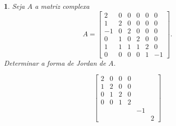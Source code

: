 \documentclass[12pt]{exam}
\newtheorem{exercicio}{}
\begin{document}
\begin{exercicio}
  Seja $A$ a matriz complexa
  \[
      A = \begin{bmatrix}
        2 & 0 & 0 & 0 & 0 & 0\\
        1 & 2 & 0 & 0 & 0 & 0\\
        -1 & 0 & 2 & 0 & 0 & 0\\
        0 & 1 & 0 & 2 & 0 & 0\\
        1 & 1 & 1 & 1 & 2 & 0\\
        0 & 0 & 0 & 0 & 1 & -1
      \end{bmatrix}.
  \]
  Determinar a forma de Jordan de $A$.
  \begin{solucao}
    \[
      \begin{bmatrix}
        2 & 0 & 0 & 0 \\
        1 & 2 & 0 & 0\\
        0 & 1 & 2 & 0\\
        0 & 0 & 1 & 2\\
         & & & & -1\\
         & & & & & 2
      \end{bmatrix}
    \]
  \end{solucao}
\end{exercicio}
\end{document}
